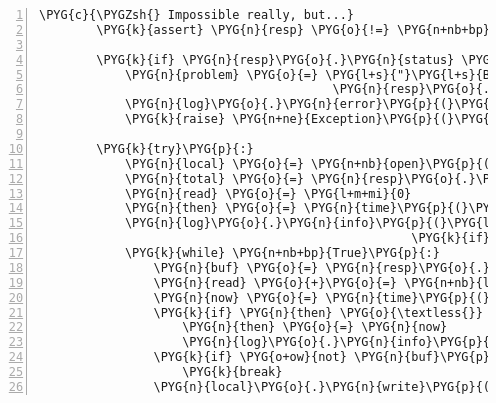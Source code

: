 \begin{Verbatim}[commandchars=\\\{\},numbers=left,firstnumber=1,stepnumber=5]
        \PYG{c}{\PYGZsh{} Impossible really, but...}
        \PYG{k}{assert} \PYG{n}{resp} \PYG{o}{!=} \PYG{n+nb+bp}{None}

        \PYG{k}{if} \PYG{n}{resp}\PYG{o}{.}\PYG{n}{status} \PYG{o}{!=} \PYG{l+m+mi}{200}\PYG{p}{:}
            \PYG{n}{problem} \PYG{o}{=} \PYG{l+s}{"}\PYG{l+s}{Bad response from server: }\PYG{l+s+si}{\PYGZpc{}d}\PYG{l+s}{ - }\PYG{l+s+si}{\PYGZpc{}s}\PYG{l+s}{"} \PYG{o}{\PYGZpc{}} \PYG{p}{(}
                                         \PYG{n}{resp}\PYG{o}{.}\PYG{n}{status}\PYG{p}{,} \PYG{n}{resp}\PYG{o}{.}\PYG{n}{msg}\PYG{o}{.}\PYG{n}{status}\PYG{p}{)}
            \PYG{n}{log}\PYG{o}{.}\PYG{n}{error}\PYG{p}{(}\PYG{n}{problem}\PYG{p}{)}
            \PYG{k}{raise} \PYG{n+ne}{Exception}\PYG{p}{(}\PYG{n}{problem}\PYG{p}{)}

        \PYG{k}{try}\PYG{p}{:}
            \PYG{n}{local} \PYG{o}{=} \PYG{n+nb}{open}\PYG{p}{(}\PYG{n+nb+bp}{self}\PYG{o}{.}\PYG{n}{sra\PYGZus{}path}\PYG{p}{,} \PYG{l+s}{"}\PYG{l+s}{w}\PYG{l+s}{"}\PYG{p}{)}
            \PYG{n}{total} \PYG{o}{=} \PYG{n}{resp}\PYG{o}{.}\PYG{n}{length}
            \PYG{n}{read} \PYG{o}{=} \PYG{l+m+mi}{0}
            \PYG{n}{then} \PYG{o}{=} \PYG{n}{time}\PYG{p}{(}\PYG{p}{)}
            \PYG{n}{log}\PYG{o}{.}\PYG{n}{info}\PYG{p}{(}\PYG{l+s}{"}\PYG{l+s}{transfering }\PYG{l+s+si}{\PYGZpc{}d}\PYG{l+s}{ kb data...}\PYG{l+s}{"} \PYG{o}{\PYGZpc{}} \PYG{p}{(}\PYG{n}{total} \PYG{o}{/} \PYG{l+m+mi}{1024}
                                                    \PYG{k}{if} \PYG{n}{total} \PYG{k}{else} \PYG{o}{-}\PYG{l+m+mi}{1}\PYG{p}{)}\PYG{p}{)}
            \PYG{k}{while} \PYG{n+nb+bp}{True}\PYG{p}{:}
                \PYG{n}{buf} \PYG{o}{=} \PYG{n}{resp}\PYG{o}{.}\PYG{n}{read}\PYG{p}{(}\PYG{l+m+mi}{16}\PYG{o}{*}\PYG{l+m+mi}{1024}\PYG{p}{)}
                \PYG{n}{read} \PYG{o}{+}\PYG{o}{=} \PYG{n+nb}{len}\PYG{p}{(}\PYG{n}{buf}\PYG{p}{)}
                \PYG{n}{now} \PYG{o}{=} \PYG{n}{time}\PYG{p}{(}\PYG{p}{)}
                \PYG{k}{if} \PYG{n}{then} \PYG{o}{\textless{}} \PYG{n}{now} \PYG{o}{-} \PYG{l+m+mi}{15}\PYG{p}{:}
                    \PYG{n}{then} \PYG{o}{=} \PYG{n}{now}
                    \PYG{n}{log}\PYG{o}{.}\PYG{n}{info}\PYG{p}{(}\PYG{l+s}{"}\PYG{l+s+si}{\PYGZpc{}d}\PYG{l+s}{ kb left}\PYG{l+s}{"} \PYG{o}{\PYGZpc{}} \PYG{p}{(}\PYG{p}{(}\PYG{p}{(}\PYG{n}{total} \PYG{o+ow}{or} \PYG{l+m+mi}{0}\PYG{p}{)} \PYG{o}{-} \PYG{n}{read}\PYG{p}{)} \PYG{o}{/} \PYG{l+m+mi}{1024}\PYG{p}{)}\PYG{p}{)}
                \PYG{k}{if} \PYG{o+ow}{not} \PYG{n}{buf}\PYG{p}{:}
                    \PYG{k}{break}
                \PYG{n}{local}\PYG{o}{.}\PYG{n}{write}\PYG{p}{(}\PYG{n}{buf}\PYG{p}{)}

\end{Verbatim}
